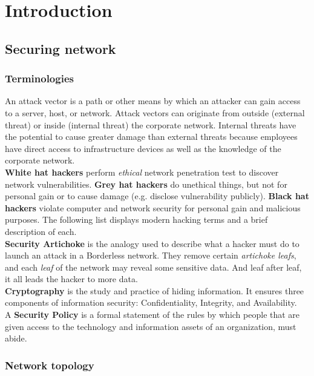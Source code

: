 \chapter{Introduction}

\section{Securing network}

\subsection{Terminologies}

An attack vector is a path or other means by which an attacker can gain access to a server, host, or network. Attack vectors can originate from outside (external threat) or inside (internal threat) the corporate network. Internal threats have the potential to cause greater damage than external threats because employees have direct access to infrastructure devices as well as the knowledge of the corporate network.\\

\textbf{White hat hackers} perform \emph{ethical} network penetration test to discover network vulnerabilities. \textbf{Grey hat hackers} do unethical things, but not for personal gain or to cause damage (e.g. disclose vulnerability publicly). \textbf{Black hat hackers} violate computer and network security for personal gain and malicious purposes. The following list displays modern hacking terms and a brief description of each.\\

\textbf{Security Artichoke} is the analogy used to describe what a hacker must do to launch an attack in a Borderless network. They  remove certain \emph{artichoke leafs}, and each \emph{leaf} of the network may reveal some sensitive data. And leaf after leaf, it all leads the hacker to more data.\\

\textbf{Cryptography} is the study and practice of hiding information. It ensures three components of information security: Confidentiality, Integrity, and Availability.\\

A \textbf{Security Policy} is a formal statement of the rules by which people that are given access to the technology and information assets of an organization, must abide.


\subsection{Network topology}

